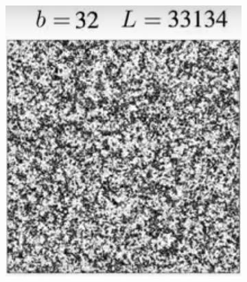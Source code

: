 \documentclass[]{article}
\begin{document}
\begin{figure}[H]
\begin{subfigure}[t]{0.3\textwidth}
	\end{subfigure}
	\begin{subfigure}[t]{0.3\textwidth}
		\includegraphics[width=\textwidth]{DouglasAshton2-3}
	\end{subfigure}
\end{figure}
\end{document}
